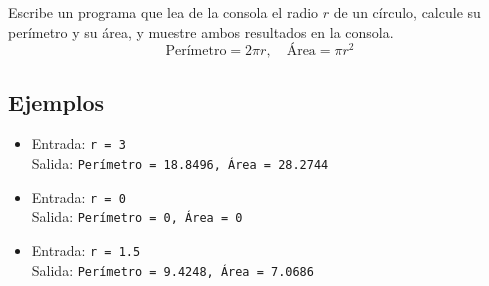 Escribe un programa que lea de la consola el radio \(r\) de un círculo, calcule su perímetro y su área, y muestre ambos resultados en la consola.\\   
\[
\text{Perímetro} = 2\pi r, \quad \text{Área} = \pi r^2
\]
\subsection*{Ejemplos}
\begin{itemize}
    \item Entrada: \texttt{r = 3}\\
          Salida: \texttt{Perímetro = 18.8496, Área = 28.2744}
    \item Entrada: \texttt{r = 0}\\
          Salida: \texttt{Perímetro = 0, Área = 0}
    \item Entrada: \texttt{r = 1.5}\\
          Salida: \texttt{Perímetro = 9.4248, Área = 7.0686}
\end{itemize}